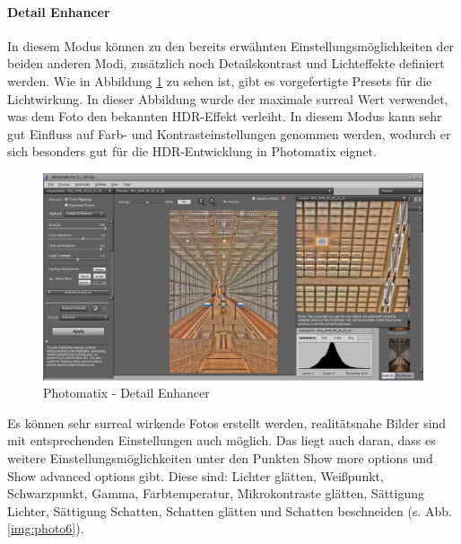 \documentclass[liststotoc,bibtotoc,fontsize=14pt,]{scrreprt}
\begin{document}
		\paragraph{Detail Enhancer} In diesem Modus können zu den bereits erwähnten Einstellungsmöglichkeiten der beiden anderen Modi, zusätzlich noch Detailskontrast und Lichteffekte definiert werden. Wie in Abbildung \ref{img:photo3} zu sehen ist, gibt es vorgefertigte Presets für die Lichtwirkung. In dieser Abbildung wurde der maximale surreal Wert verwendet, was dem Foto den bekannten HDR-Effekt verleiht.
		In diesem Modus kann sehr gut Einfluss auf Farb- und Kontrasteinstellungen genommen werden, wodurch er sich besonders gut für die HDR-Entwicklung in Photomatix eignet. 
		
		\bigskip
		\begin{figure}[H]
			\includegraphics[width=\linewidth]{img/photo3.jpg}
			\caption{Photomatix - Detail Enhancer}
			\label{img:photo3}
		\end{figure}
	
		Es können sehr surreal wirkende Fotos erstellt werden, realitätsnahe Bilder sind mit entsprechenden Einstellungen auch möglich. Das liegt auch daran, dass es weitere Einstellungsmöglichkeiten unter den Punkten \grqq{}Show more options\grqq{} und \grqq{}Show advanced options\grqq{} gibt. Diese sind: Lichter glätten, Weißpunkt,	Schwarzpunkt, Gamma, Farbtemperatur, Mikrokontraste glätten, Sättigung Lichter, Sättigung Schatten, Schatten glätten und Schatten beschneiden (s. Abb. \ref{img:photo6}).
		
\end{document}
